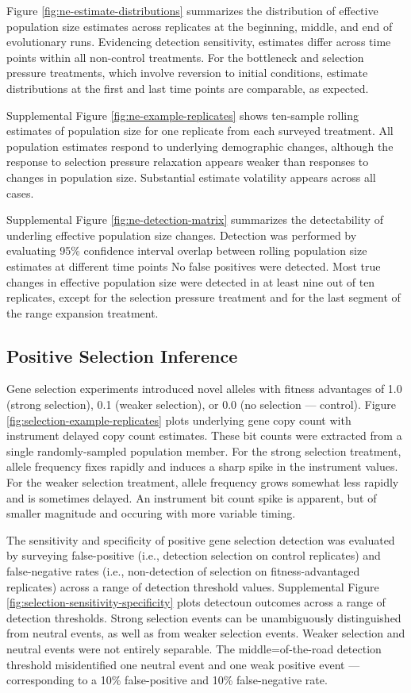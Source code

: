 Figure \ref{fig:ne-estimate-distributions} summarizes the distribution of effective population size estimates across replicates at the beginning, middle, and end of evolutionary runs.
Evidencing detection sensitivity, estimates differ across time points within all non-control treatments.
For the bottleneck and selection pressure treatments, which involve reversion to initial conditions, estimate distributions at the first and last time points are comparable, as expected.

Supplemental Figure \ref{fig:ne-example-replicates} shows ten-sample rolling estimates of population size for one replicate from each surveyed treatment.
All population estimates respond to underlying demographic changes, although the response to selection pressure relaxation appears weaker than responses to changes in population size.
Substantial estimate volatility appears across all cases.

Supplemental Figure \ref{fig:ne-detection-matrix} summarizes the detectability of underling effective population size changes.
Detection was performed by evaluating 95\% confidence interval overlap between rolling population size estimates at different time points
No false positives were detected.
Most true changes in effective population size were detected in at least nine out of ten replicates, except for the selection pressure treatment and for the last segment of the range expansion treatment.

\subsection{Positive Selection Inference}

Gene selection experiments introduced novel alleles with fitness advantages of 1.0 (strong selection), 0.1 (weaker selection), or 0.0 (no selection --- control).
Figure \ref{fig:selection-example-replicates} plots underlying gene copy count with instrument delayed copy count estimates.
These bit counts were extracted from a single randomly-sampled population member.
For the strong selection treatment, allele frequency fixes rapidly and induces a sharp spike in the instrument values.
For the weaker selection treatment, allele frequency grows somewhat less rapidly and is sometimes delayed.
An instrument bit count spike is apparent, but of smaller magnitude and occuring with more variable timing.

The sensitivity and specificity of positive gene selection detection was evaluated by surveying false-positive (i.e., detection selection on control replicates) and false-negative rates (i.e., non-detection of selection on fitness-advantaged replicates) across a range of detection threshold values.
Supplemental Figure \ref{fig:selection-sensitivity-specificity} plots detectoun outcomes across a range of detection thresholds.
Strong selection events can be unambiguously distinguished from neutral events, as well as from weaker selection events.
Weaker selection and neutral events were not entirely separable.
The middle=of-the-road detection threshold misidentified one neutral event and one weak positive event --- corresponding to a 10\% false-positive and 10\% false-negative rate.
